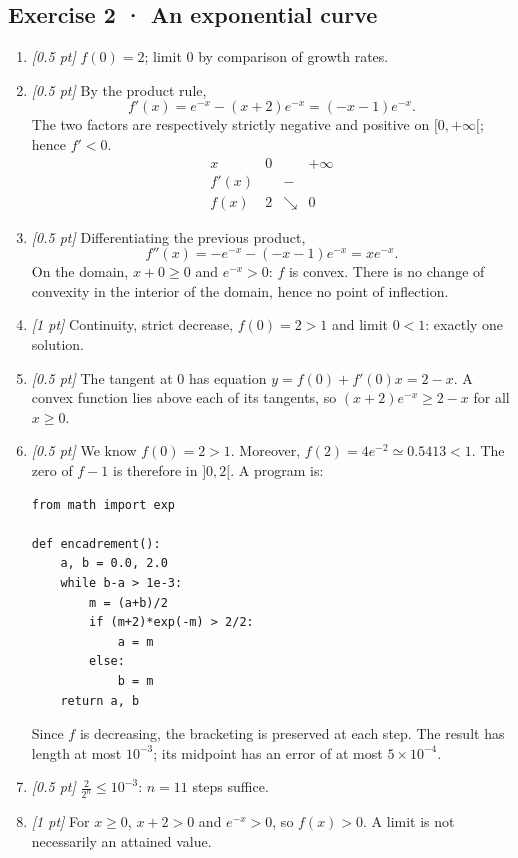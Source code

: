 \subsection*{Exercise 2 · An exponential curve}\begin{enumerate}

\item \textit{[0.5 pt]} $f(0)=2$; limit $0$ by comparison of growth rates.

\item \textit{[0.5 pt]} By the product rule,
\[f'(x)=e^{-x}-(x+2)e^{-x}=(-x-1)e^{-x}.\]
The two factors are respectively strictly negative and positive on $[0,+\infty[$; hence $f'<0$.
\[\begin{array}{c|ccc}x&0&&+\infty\\\hline f'(x)&&-&\\\hline f(x)&2&\searrow&0\end{array}\]

\item \textit{[0.5 pt]} Differentiating the previous product,
\[f''(x)=-e^{-x}-(-x-1)e^{-x}=xe^{-x}.\]
On the domain, $x+0\ge0$ and $e^{-x}>0$: $f$ is convex. There is no change of convexity in the interior of the domain, hence no point of inflection.

\item \textit{[1 pt]} Continuity, strict decrease, $f(0)=2>1$ and limit $0<1$: exactly one solution.

\item \textit{[0.5 pt]} The tangent at $0$ has equation $y=f(0)+f'(0)x=2-x$. A convex function lies above each of its tangents, so $(x+2)e^{-x}\ge 2-x$ for all $x\ge0$.


\item \textit{[0.5 pt]} We know $f(0)=2>1$. Moreover, $f(2)=4e^{-2}\simeq\num{0,5413}<1$. The zero of $f-1$ is therefore in $]0,2[$. A program is:
\begin{lstlisting}
from math import exp

def encadrement():
    a, b = 0.0, 2.0
    while b-a > 1e-3:
        m = (a+b)/2
        if (m+2)*exp(-m) > 2/2:
            a = m
        else:
            b = m
    return a, b
\end{lstlisting}
Since $f$ is decreasing, the bracketing is preserved at each step. The result has length at most $10^{-3}$; its midpoint has an error of at most $5\times10^{-4}$.

\item \textit{[0.5 pt]} $\frac{2}{2^n}\le10^{-3}$: $n=11$ steps suffice.

\item \textit{[1 pt]} For $x\ge0$, $x+2>0$ and $e^{-x}>0$, so $f(x)>0$. A limit is not necessarily an attained value.

\end{enumerate}


